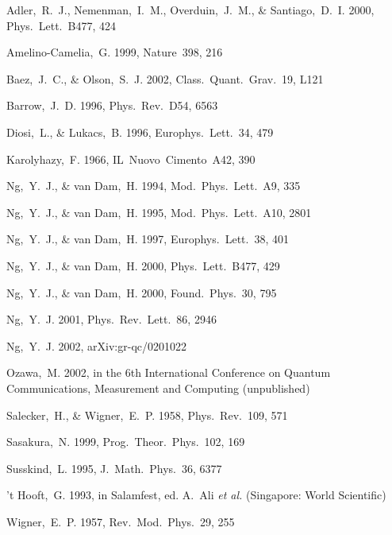 \documentclass[preprint2]{aastex}
\begin{document}
\begin{thebibliography}{}

Adler,~R.~J., Nemenman,~I.~M., Overduin,~J.~M., \& Santiago,~D.~I. 2000,
Phys.\ Lett.\ B477, 424

Amelino-Camelia,~G. 1999,
Nature\ 398, 216

Baez,~J.~C., \& Olson,~S.~J. 2002,
Class.\ Quant.\ Grav.\ 19, L121

Barrow,~J.~D. 1996,
Phys.\ Rev.\ D54, 6563

Diosi,~L., \& Lukacs,~B. 1996,
Europhys.\ Lett.\ 34, 479

Karolyhazy,~F. 1966,
IL\ Nuovo\ Cimento\ A42, 390

Ng,~Y.~J., \& van Dam,~H. 1994,
Mod.\ Phys.\ Lett.\ A9, 335

Ng,~Y.~J., \& van Dam,~H. 1995,
Mod.\ Phys.\ Lett.\ A10, 2801

Ng,~Y.~J., \& van Dam,~H. 1997,
Europhys.\ Lett.\ 38, 401

Ng,~Y.~J., \& van Dam,~H. 2000,
Phys.\ Lett.\ B477, 429

Ng,~Y.~J., \& van Dam,~H. 2000,
Found.\ Phys.\ 30, 795

Ng,~Y.~J. 2001,
Phys.\ Rev.\ Lett.\ 86, 2946

Ng,~Y.~J. 2002,
arXiv:gr-qc/0201022

Ozawa,~M. 2002,
in the 6th International Conference on Quantum Communications,
Measurement and Computing (unpublished)

Salecker,~H., \& Wigner,~E.~P. 1958,
Phys.\ Rev.\ 109, 571

Sasakura,~N. 1999,
Prog.\ Theor.\ Phys.\ 102, 169

Susskind,~L. 1995,
J.\ Math.\ Phys.\ 36, 6377

't Hooft,~G. 1993,
in Salamfest, ed. A.~Ali {\it et al.} (Singapore: World Scientific)

Wigner,~E.~P. 1957,
Rev.\ Mod.\ Phys.\ 29, 255

\end{thebibliography}
\end{document}
